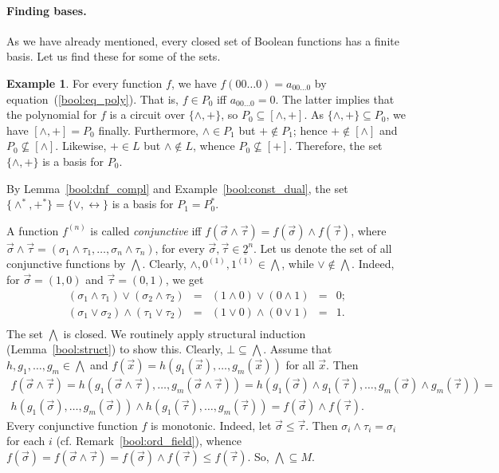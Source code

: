 \documentclass[12pt,notitlepage]{article}
\theoremstyle{plain}
\theoremstyle{definition}
\newtheorem{exm}[thm]{Example}
\theoremstyle{plain}
\newcommand{\sbs}{\subseteq}
\newcommand{\ul}[1]{\underline{#1}}
\newcommand{\1}{\mathbf{1}}
\newcommand{\0}{\mathbf{0}}
\begin{document}
\paragraph{Finding bases.}
As we have already mentioned, every closed set of Boolean functions has a finite basis. Let us find these for some of the sets.

\begin{exm}
For every function $f$, we have $f(00\ldots0) = a_{00\ldots0}$ by equation~(\ref{bool:eq_poly}). That is, $f \in P_0$ iff $a_{00\ldots0} = 0$. The latter implies that the polynomial for $f$ is a circuit over $\{{\wedge}, {+}\}$, so $P_0 \sbs [{\wedge}, {+}]$. As $\{{\wedge}, {+}\} \sbs P_0$, we have $[{\wedge}, {+}] = P_0$ finally. Furthermore, ${\wedge} \in P_1$ but ${+} \notin P_1$; hence ${+} \notin [{\wedge}]$ and $P_0 \not\sbs [{\wedge}]$. Likewise, ${+} \in L$ but ${\wedge} \notin L$, whence $P_0 \not\sbs [{+}]$. Therefore, the set $\{{\wedge}, {+}\}$ is a basis for $P_0$.

By Lemma~\ref{bool:dnf_compl} and Example~\ref{bool:const_dual}, the set $\{{\wedge^*}, {+^*}\} = \{{\vee}, {\leftrightarrow}\}$ is a basis for $P_1 = P^*_0$.
\end{exm}

A function $f^{(n)}$ is called \emph{conjunctive} iff $f(\vec \sigma \wedge \vec\tau) = f(\vec\sigma) \wedge f(\vec\tau)$, where $\vec \sigma \wedge \vec\tau = (\sigma_1 \wedge \tau_1, \ldots, \sigma_n \wedge \tau_n)$, for every $\vec\sigma, \vec\tau \in \ul{2}^n$. Let us denote the set of all conjunctive functions by $\bigwedge$. Clearly, ${\wedge}, 0^{(1)}, 1^{(1)} \in {\bigwedge}$, while ${\vee} \notin {\bigwedge}$. Indeed, for $\vec \sigma = (1, 0)$ and $\vec \tau = (0, 1)$, we get
$$\begin{array}{rcccl}
(\sigma_1 \wedge \tau_1) \vee (\sigma_2 \wedge \tau_2) &=& (1 \wedge 0) \vee (0 \wedge 1) &=& 0;\\
(\sigma_1 \vee \sigma_2) \wedge (\tau_1 \vee \tau_2) &=& (1 \vee 0) \wedge (0 \vee 1) &=& 1.\\
\end{array}$$
The set $\bigwedge$ is closed. We routinely apply structural induction (Lemma~\ref{bool:struct}) to show this. Clearly, $\bot \sbs {\bigwedge}$. Assume that $h, g_1, \ldots,g_m \in {\bigwedge}$ and $f(\vec x) = h(g_1(\vec x),\ldots, g_m(\vec x))$ for all $\vec x$. Then
\begin{multline*}
f(\vec \sigma \wedge \vec\tau) = h(g_1(\vec \sigma \wedge \vec\tau),\ldots, g_m(\vec \sigma \wedge \vec\tau)) =
 h(g_1(\vec\sigma) \wedge g_1(\vec\tau),\ldots,g_m(\vec\sigma) \wedge g_m(\vec\tau)) =\\
  h(g_1(\vec \sigma),\ldots, g_m(\vec \sigma)) \wedge h(g_1(\vec \tau),\ldots, g_m(\vec \tau)) = f(\vec\sigma) \wedge f(\vec\tau).
\end{multline*}
Every conjunctive function $f$ is monotonic. Indeed, let $\vec \sigma \leq \vec\tau$. Then $\sigma_i \wedge \tau_i = \sigma_i$ for each $i$ (cf. Remark~\ref{bool:ord_field}), whence $f(\vec \sigma) = f(\vec \sigma \wedge \vec\tau) = f(\vec\sigma) \wedge f(\vec\tau) \leq f(\vec{\tau})$. So, ${\bigwedge} \sbs M$.
\end{document}

